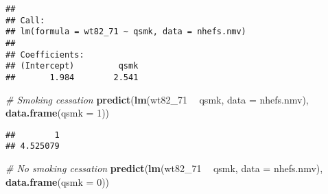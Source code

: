 \documentclass[
  10pt,
]{book}
\newenvironment{Shaded}{\begin{snugshade}}{\end{snugshade}}
\newcommand{\CommentTok}[1]{\textcolor[rgb]{0.56,0.35,0.01}{\textit{#1}}}
\newcommand{\DataTypeTok}[1]{\textcolor[rgb]{0.13,0.29,0.53}{#1}}
\newcommand{\DecValTok}[1]{\textcolor[rgb]{0.00,0.00,0.81}{#1}}
\newcommand{\KeywordTok}[1]{\textcolor[rgb]{0.13,0.29,0.53}{\textbf{#1}}}
\newcommand{\NormalTok}[1]{#1}
\newcommand{\OperatorTok}[1]{\textcolor[rgb]{0.81,0.36,0.00}{\textbf{#1}}}
\newcommand{\StringTok}[1]{\textcolor[rgb]{0.31,0.60,0.02}{#1}}
\begin{document}
\begin{Shaded}
\end{Shaded}

\begin{verbatim}
## 
## Call:
## lm(formula = wt82_71 ~ qsmk, data = nhefs.nmv)
## 
## Coefficients:
## (Intercept)         qsmk  
##       1.984        2.541
\end{verbatim}

\begin{Shaded}
\begin{Highlighting}[]
\CommentTok{# Smoking cessation}
\KeywordTok{predict}\NormalTok{(}\KeywordTok{lm}\NormalTok{(wt82_}\DecValTok{71} \OperatorTok{~}\StringTok{ }\NormalTok{qsmk, }\DataTypeTok{data =}\NormalTok{ nhefs.nmv), }\KeywordTok{data.frame}\NormalTok{(}\DataTypeTok{qsmk =} \DecValTok{1}\NormalTok{))}
\end{Highlighting}
\end{Shaded}

\begin{verbatim}
##        1 
## 4.525079
\end{verbatim}

\begin{Shaded}
\begin{Highlighting}[]
\CommentTok{# No smoking cessation}
\KeywordTok{predict}\NormalTok{(}\KeywordTok{lm}\NormalTok{(wt82_}\DecValTok{71} \OperatorTok{~}\StringTok{ }\NormalTok{qsmk, }\DataTypeTok{data =}\NormalTok{ nhefs.nmv), }\KeywordTok{data.frame}\NormalTok{(}\DataTypeTok{qsmk =} \DecValTok{0}\NormalTok{)) }
\end{Highlighting}
\end{Shaded}
\end{document}
